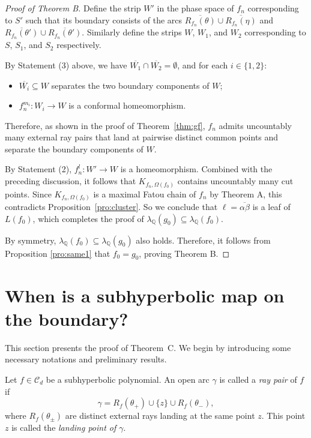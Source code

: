 \documentclass[a4paper,reqno,times, 11pt]{amsart}
\theoremstyle{remark}
\theoremstyle{plain}
\numberwithin{equation}{section}
\def\CCCC{\mathscr C}
\def\g{\gamma}
\def\Q{\mathbb Q}
\begin{document}
\begin{proof}[{Proof of Theorem B}]
		Define the strip $W'$ in the phase space of $f_{n}$ corresponding to $S'$ such that its boundary consists of the arcs $\overline{R_{f_{n}}(\theta)} \cup \overline{R_{f_{n}}(\eta)}$ and $\overline{R_{f_{n}}(\theta')} \cup \overline{R_{f_{n}}(\theta')}$. Similarly define the strips $W$, $W_1$, and $W_2$ corresponding to $S$, $S_1$, and $S_2$ respectively.
		
		By Statement (3) above, we have $\overline{W_1} \cap \overline{W_2} = \emptyset$, and for each $i \in \{1,2\}$:
		\begin{itemize}
			\item $\overline{W_i} \subseteq W$ separates the two boundary components of $W$;
			\item $f_{n}^{m_i}: W_i \to W$ is a conformal homeomorphism.
		\end{itemize}
		Therefore, as shown in the proof of Theorem~\ref{thm:gf}, $f_{n}$ admits uncountably many external ray pairs that land at pairwise distinct common points and separate the boundary components of $W$.
		
		By Statement (2), $f_{n}^l: W' \to W$ is a homeomorphism. Combined with the preceding discussion, it follows that $K_{f_{n},\Omega(f_0)}$ contains uncountably many cut points. Since $K_{f_{n},\Omega(f_0)}$ is a maximal Fatou chain of $f_{n}$ by Theorem A, this contradicts Proposition~\ref{pro:cluster}.	
	So we conclude that $\ell=\overline{\alpha\beta}$ is a leaf of $L(f_0)$, which completes the proof of $\lambda_\Q(g_0)\subseteq \lambda_\Q(f_0)$. 
	
	By symmetry,  $\lambda_\Q(f_0)\subseteq \lambda_\Q(g_0)$ also holds. Therefore, it follows from Proposition \ref{pro:same1} that $f_0=g_0$, proving Theorem B.
\end{proof}

\section{When is a subhyperbolic map on the boundary?}\label{sec:C}

This section presents the proof of Theorem~C. We begin by introducing some necessary notations and preliminary results.

Let $f\in\CCCC_d$ be a subhyperbolic polynomial. An open arc $\g$ is called a \emph{ray pair} of $f$ if
\[\g=R_f(\theta_+)\cup\{z\}\cup R_f(\theta_-),\]
where $R_f(\theta_\pm)$ are distinct external rays landing at the same point $z$. This point $z$ is called the \emph{landing point of $\g$}.
\end{document}
